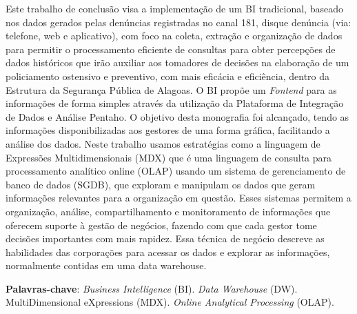 %
%

\begin{RESUMO}
\thispagestyle{empty}
	\begin{SingleSpace}
	
		\hspace{-1.2 cm}Este trabalho de conclusão visa a implementação de um BI tradicional, baseado nos dados gerados pelas denúncias registradas no canal 181, disque denúncia (via: telefone, web e aplicativo), com foco na coleta, extração e organização de dados para permitir o processamento eficiente de consultas para obter percepções de dados históricos que irão auxiliar aos tomadores de decisões na elaboração de um policiamento ostensivo e preventivo, com mais eficácia e eficiência, dentro da Estrutura da Segurança Pública de Alagoas. O BI propõe um \textit{Fontend} para as informações de forma simples através da utilização da Plataforma de Integração de Dados e Análise Pentaho. O objetivo desta monografia foi alcançado, tendo as informações disponibilizadas aos gestores de uma forma gráfica, facilitando a análise dos dados. Neste trabalho usamos estratégias como a linguagem de Expressões Multidimensionais (MDX) que é uma linguagem de consulta para processamento analítico online (OLAP) usando um sistema de gerenciamento de banco de dados (SGDB), que exploram e manipulam os dados que geram informações relevantes para a organização em questão. Esses sistemas permitem a organização, análise, compartilhamento e monitoramento de informações que oferecem suporte à gestão de negócios, fazendo com que cada gestor tome decisões importantes com mais rapidez. Essa técnica de negócio descreve as habilidades das corporações para acessar os dados e explorar as informações, normalmente contidas em uma data warehouse.


		\vspace*{0.5cm}\hspace{-1.3 cm}\textbf{Palavras-chave}: \textit{Business Intelligence} (BI). \textit{Data Warehouse} (DW). MultiDimensional eXpressions (MDX). \textit{Online Analytical Processing} (OLAP).
		
		
		
	\end{SingleSpace}
\end{RESUMO}


